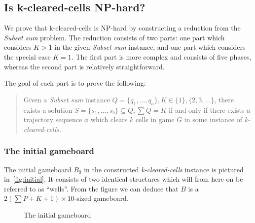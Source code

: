 \subsection{Is k-cleared-cells NP-hard?}

We prove that k-cleared-cells is NP-hard by constructing a reduction from the \textit{Subset sum} problem. The reduction consists of two parts: one part which considers $K > 1$ in the given \textit{Subset sum} instance, and one part which considers the special case $K = 1$. The first part is more complex and consists of five phases, whereas the second part is relatively straightforward.

The goal of each part is to prove the following: 

\begin{quote}
Given a \textit{Subset sum} instance $Q = \{q_1, \ldots, q_a\}, K \in \{1\} ,\{2, 3, \ldots \}$, there exists a solution $S = \{s_1, \ldots, s_b \} \subseteq Q, \sum Q = K$ if and only if there exists a trajectory sequence $\phi$ which clears $k$ cells in game $G$ in some instance of \textit{k-cleared-cells}.
\end{quote}

\subsubsection{The initial gameboard}

The initial gameboard $B_0$ in the constructed \textit{k-cleared-cells} instance is pictured in~\autoref{fig:initial}. It consists of two identical structures which will from here on be referred to as ``wells''. From the figure we can deduce that $B$ is a $2 \left( \sum P + K + 1 \right) \times 10$-sized gameboard.

\begin{figure}[H]
    \centering
    \caption{The initial gameboard}
    \label{fig:initial}
\end{figure}

